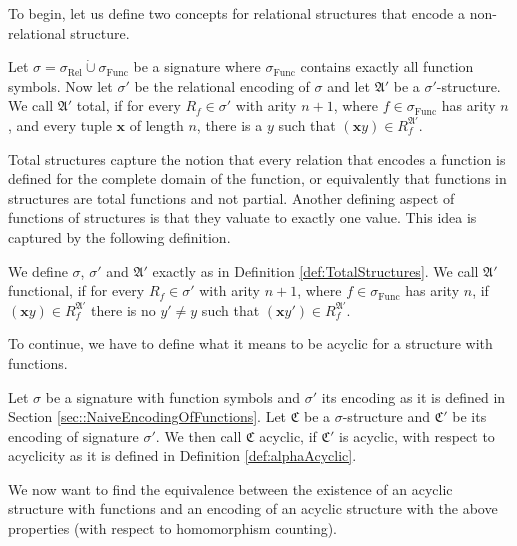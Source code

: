 To begin, let us define two concepts for relational structures that encode a non-relational structure.

\begin{definition}
	\label{def:TotalStructures}
	Let $\sigma= \sigma_{\operatorname{Rel}} \operatorname{\dot{\cup}} \sigma_{\operatorname{Func}}$ be a signature where $\sigma_{\operatorname{Func}}$ contains exactly all function symbols.
	Now let $\sigma'$ be the relational encoding of $\sigma$ and let $\mathfrak A'$ be a $\sigma'$-structure.
	We call $\mathfrak A'$ total, if for every $R_{f}\in\sigma'$ with arity $n+1$, where $f\in \sigma_{\operatorname{Func}}$ has arity $n$, and every tuple $\mathbf x$ of length $n$, there is a $y$ such that $(\mathbf xy)\in R^{\mathfrak A'}_{f}$.
\end{definition}

Total structures capture the notion that every relation that encodes a function is defined for the complete domain of the function, or equivalently that functions in structures are total functions and not partial.
Another defining aspect of functions of structures is that they valuate to exactly one value.
This idea is captured by the following definition.

\begin{definition}
	We define $\sigma$, $\sigma'$ and $\mathfrak A'$ exactly as in Definition \ref{def:TotalStructures}.
	We call $\mathfrak A'$ functional, if for every $R_{f}\in\sigma'$ with arity $n+1$, where $f\in \sigma_{\operatorname{Func}}$ has arity $n$, if $(\mathbf xy)\in R^{\mathfrak A'}_{f}$ there is no $y'\neq y$ such that $(\mathbf xy')\in R^{\mathfrak A'}_{f}$.
\end{definition}
To continue, we have to define what it means to be acyclic for a structure with functions.

\begin{definition}
	Let $\sigma$ be a signature with function symbols and $\sigma'$ its encoding as it is defined in Section \ref{sec::NaiveEncodingOfFunctions}.
	Let $\mathfrak C$ be a $\sigma$-structure and $\mathfrak C'$ be its encoding of signature $\sigma'$.
	We then call $\mathfrak C$ acyclic, if $\mathfrak C'$ is acyclic, with respect to acyclicity as it is defined in Definition \ref{def:alphaAcyclic}.
\end{definition}

We now want to find the equivalence between the existence of an acyclic structure with functions and an encoding of an acyclic structure with the above properties (with respect to homomorphism counting).

